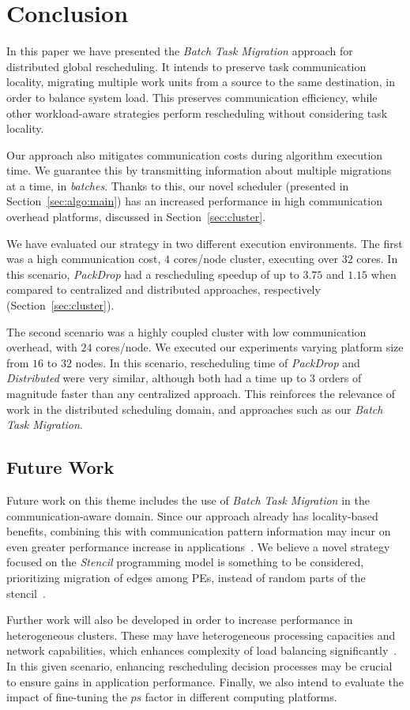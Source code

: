 \section{Conclusion} \label{sec:conclusion}

In this paper we have presented the \textit{Batch Task Migration} approach for distributed global rescheduling.
It intends to preserve task communication locality, migrating multiple work units from a source to the same destination, in order to balance system load.
This preserves communication efficiency, while other workload-aware strategies perform rescheduling without considering task locality.

Our approach also mitigates communication costs during algorithm execution time.
We guarantee this by transmitting information about multiple migrations at a time, in \textit{batches}.
Thanks to this, our novel scheduler (presented in Section~\ref{sec:algo:main}) has an increased performance in high communication overhead platforms, discussed in Section~\ref{sec:cluster}.

We have evaluated our strategy in two different execution environments. 
The first was a high communication cost, $4$ cores/node cluster, executing over $32$ cores.
In this scenario, \textit{PackDrop} had a rescheduling speedup of up to $3.75$ and $1.15$ when compared to centralized and distributed approaches, respectively (Section~\ref{sec:cluster}).

The second scenario was a highly coupled cluster with low communication overhead, with $24$ cores/node.
We executed our experiments varying platform size from $16$ to $32$ nodes.
In this scenario, rescheduling time of \textit{PackDrop} and \textit{Distributed} were very similar, although both had a time up to $3$ orders of magnitude faster than any centralized approach. %
This reinforces the relevance of work in the distributed scheduling domain, and approaches such as our \textit{Batch Task Migration}.

\subsection{Future Work}

Future work on this theme includes the use of \textit{Batch Task Migration} in the communication-aware domain.
Since our approach already has locality-based benefits, combining this with communication pattern information may incur on even greater performance increase in applications~\cite{Unat2017localitysurvey,commaware}.
We believe a novel strategy focused on the \textit{Stencil} programming model is something to be considered, prioritizing migration of edges among PEs, instead of random parts of the stencil~\cite{stenciltiling}.

Further work will also be developed in order to increase performance in heterogeneous clusters.
These may have heterogeneous processing capacities and network capabilities, which enhances complexity of load balancing significantly~\cite{Beri2015hetws,Cheriere2015hetdist}.
In this given scenario, enhancing rescheduling decision processes may be crucial to ensure gains in application performance.
Finally, we also intend to evaluate the impact of fine-tuning the $ps$ factor in different computing platforms.